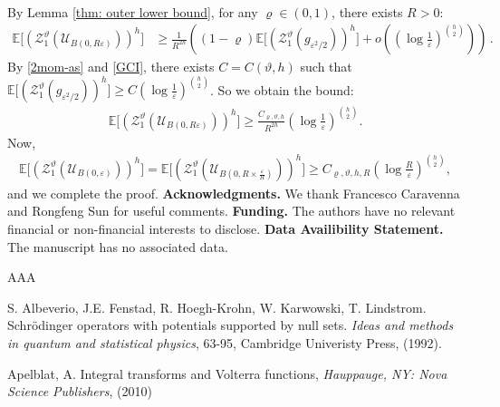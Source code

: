 \documentclass[a4paper,reqno,11pt]{amsart}
\makeatletter
\renewenvironment{proof}[1][\proofname]{\par
\pushQED{\qed}%
\normalfont \topsep4\p@\@plus4\p@\relax
\trivlist
\item[\hskip\labelsep
\bfseries
#1\@addpunct{.}]\ignorespaces
}{%
\popQED\endtrivlist\@endpefalse
}
\numberwithin{equation}{section}
\theoremstyle{mytheorem}
\newcommand{\bbE}{{\ensuremath{\mathbb E}} }
\newcommand{\cU}{{\ensuremath{\mathcal U}} }
\newcommand{\gt}{\vartheta}
\renewcommand{\epsilon}{\varepsilon}
\renewcommand{\rho}{\varrho}
\newcommand\qa{\bigg[}
\newcommand\qb{\bigg]}
\newcommand\ra{\left(}
\newcommand\rb{\right)}
\newcommand{\f}{\frac}
\makeatother
\begin{document}
{\begin{proof}[Proof of the Lower bound in \eqref{central}]
\begin{align}
\end{align}
By Lemma \ref{thm: outer lower bound}, for any $\rho\in(0,1)$, there exists $R>0$:
\begin{align*}
    \bbE \qa \ra \mathscr{Z}^\gt_1(\cU_{B(0,R\epsilon)}) \rb^h \qb
    & \ge \f{1}{R^{2h}}\ra (1-\rho) \bbE \qa \ra \mathscr{Z}^\gt_1( g_{\epsilon^2/2} ) \rb^h \qb
    + o \ra \ra \log \f{1}{\epsilon} \rb^{h\choose 2} \rb \rb \,.
\end{align*}
By \eqref{2mom-as} and \eqref{GCI}, there exists $C=C(\gt,h)$ such that $\bbE \qa \ra \mathscr{Z}^\gt_1( g_{\epsilon^2/2} ) \rb^h \qb \ge C \ra\log\f{1}{\epsilon}\rb^{h\choose 2}$. So we obtain the bound:
\begin{align*}
    \bbE \qa \ra \mathscr{Z}^\gt_1(\cU_{B(0,R\epsilon)}) \rb^h \qb
    \ge \f{C_{\rho, \gt, h}}{ R^{2h} }  \ra \log\f{1}{\epsilon} \rb^{h\choose 2}.
\end{align*}
Now, 
\begin{align*}
    \bbE \qa \ra \mathscr{Z}^\gt_1(\cU_{B(0,\epsilon)}) \rb^h \qb
    = \bbE \qa \ra \mathscr{Z}^\gt_1(\cU_{B(0,R \times \f{\epsilon}{R} )}) \rb^h \qb
    \ge C_{\rho, \gt, h, R} \ra \log\f{R}{\epsilon} \rb^{h\choose 2}  ,
\end{align*}
and we complete the proof.
\end{proof}
\vskip 4mm
{\bf Acknowledgments.} We thank Francesco Caravenna and Rongfeng Sun for useful comments.
\vskip 4mm
{\bf Funding.} The authors have no relevant financial or non-financial interests to disclose.
\vskip 4mm
{\bf Data Availibility Statement.} The manuscript has no associated data.

\begin{thebibliography}{AAA}

S. Albeverio, J.E. Fenstad, R. Hoegh-Krohn, W. Karwowski, T. Lindstrom.
Schr\"odinger operators with potentials supported by null sets.
{\em Ideas and methods in quantum and statistical physics}, 63-95,
Cambridge Univeristy Press, (1992).

Apelblat, A. Integral transforms and Volterra functions,
{\em Hauppauge, NY: Nova Science Publishers}, (2010) 


\end{thebibliography}}
\end{document}

